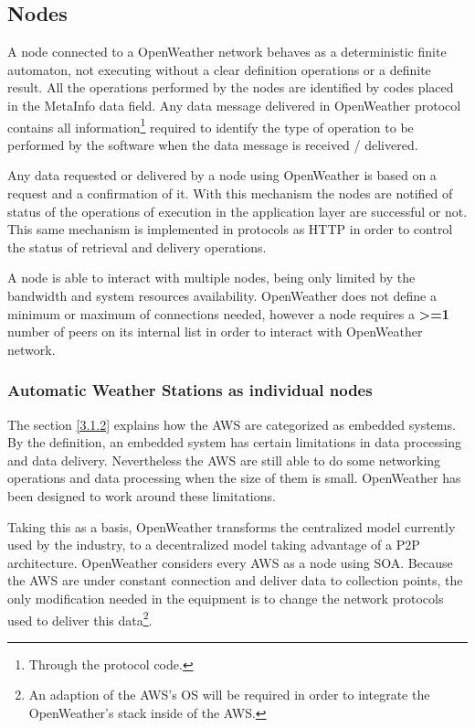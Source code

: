 \subsection{Nodes}

A node connected to a OpenWeather network behaves as a deterministic finite automaton, not executing without a clear definition operations or a definite result. All the operations performed by the nodes are identified by codes placed in the MetaInfo data field. Any data message delivered in OpenWeather protocol contains all information\footnote{Through the protocol code.} required to identify the type of operation to be performed by the software when the data message is received / delivered.

Any data requested or delivered by a node using OpenWeather is based on a request and a confirmation of it. With this mechanism the nodes are notified of status of the operations of execution in the application layer are successful or not. This same mechanism is implemented in protocols as \gls{HTTP}\cite{rfc2616} in order to control the status of retrieval and delivery operations.

A node is able to interact with multiple nodes, being only limited by the bandwidth and system resources availability. OpenWeather does not define a minimum or maximum of connections needed, however a node requires a \textbf{>=1} number of peers on its internal list in order to interact with OpenWeather network.

\subsubsection{Automatic Weather Stations as individual nodes}

The section \ref{3.1.2} explains how the \gls{AWS} are categorized as embedded systems. By the definition, an embedded system has certain limitations in data processing and data delivery. Nevertheless the \gls{AWS} are still able to do some networking operations and data processing when the size of them is small. OpenWeather has been designed to work around these limitations.

Taking this as a basis, OpenWeather transforms the centralized model currently used by the industry, to a decentralized model taking advantage of a \gls{P2P} architecture. OpenWeather considers every \gls{AWS} as a node using \gls{SOA}. Because the \gls{AWS} are under constant connection and deliver data to collection points, the only modification needed in the equipment is to change the network protocols used to deliver this data\footnote{An adaption of the \gls{AWS}'s \gls{OS} will be required in order to integrate the OpenWeather's stack inside of the \gls{AWS}.}.

